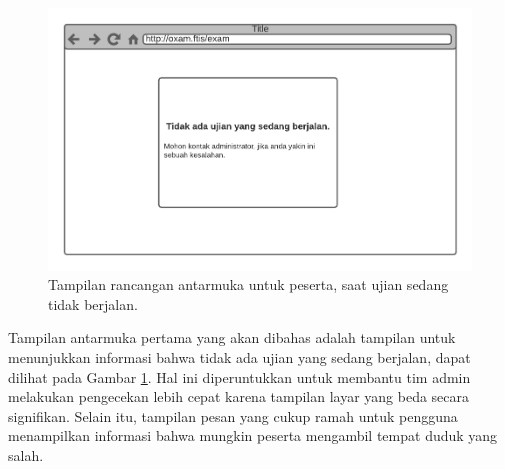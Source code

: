     \begin{figure}[H]
        \centering
        \includegraphics[width=0.7\paperwidth]{Gambar/mockups/Mockup--Peserta - Blankstate.pdf}
        \caption{Tampilan rancangan antarmuka untuk peserta, saat ujian sedang tidak berjalan.}
        \label{fig:mockup_peserta_blankstate}
    \end{figure}
     Tampilan antarmuka pertama yang akan dibahas adalah tampilan untuk menunjukkan informasi bahwa
     tidak ada ujian yang sedang berjalan, dapat dilihat pada Gambar \ref{fig:mockup_peserta_blankstate}. 
     Hal ini diperuntukkan untuk membantu tim admin melakukan pengecekan lebih cepat karena 
     tampilan layar yang beda secara
     signifikan. Selain itu, tampilan pesan yang cukup ramah untuk pengguna menampilkan 
     informasi bahwa mungkin peserta mengambil tempat duduk yang salah.

